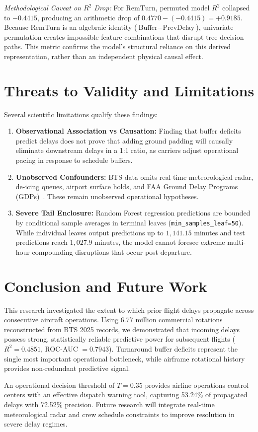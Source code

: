 \documentclass[conference]{IEEEtran}
\begin{document}
\textit{Methodological Caveat on $R^2$ Drop:} For $\text{RemTurn}$, permuted model $R^2$ collapsed to $-0.4415$, producing an arithmetic drop of $0.4770 - (-0.4415) = +0.9185$. Because $\text{RemTurn}$ is an algebraic identity ($\text{Buffer} - \text{PrevDelay}$), univariate permutation creates impossible feature combinations that disrupt tree decision paths. This metric confirms the model's structural reliance on this derived representation, rather than an independent physical causal effect.

\section{Threats to Validity and Limitations}
Several scientific limitations qualify these findings:
\begin{enumerate}
    \item \textbf{Observational Association vs Causation:} Finding that buffer deficits predict delays does not prove that adding ground padding will causally eliminate downstream delays in a 1:1 ratio, as carriers adjust operational pacing in response to schedule buffers.
    \item \textbf{Unobserved Confounders:} BTS data omits real-time meteorological radar, de-icing queues, airport surface holds, and FAA Ground Delay Programs (GDPs)~\cite{faa2024atcscc}. These remain unobserved operational hypotheses.
    \item \textbf{Severe Tail Enclosure:} Random Forest regression predictions are bounded by conditional sample averages in terminal leaves (\texttt{min\_samples\_leaf=50}). While individual leaves output predictions up to $1,141.15$ minutes and test predictions reach $1,027.9$ minutes, the model cannot foresee extreme multi-hour compounding disruptions that occur post-departure.
\end{enumerate}

\enlargethispage{2\baselineskip}
\section{Conclusion and Future Work}
This research investigated the extent to which prior flight delays propagate across consecutive aircraft operations. Using 6.77 million commercial rotations reconstructed from BTS 2025 records, we demonstrated that incoming delays possess strong, statistically reliable predictive power for subsequent flights ($R^2 = 0.4851$, ROC-AUC $= 0.7943$). Turnaround buffer deficits represent the single most important operational bottleneck, while airframe rotational history provides non-redundant predictive signal.

An operational decision threshold of $T = 0.35$ provides airline operations control centers with an effective dispatch warning tool, capturing 53.24\% of propagated delays with 72.52\% precision. Future research will integrate real-time meteorological radar and crew schedule constraints to improve resolution in severe delay regimes.



\end{document}
